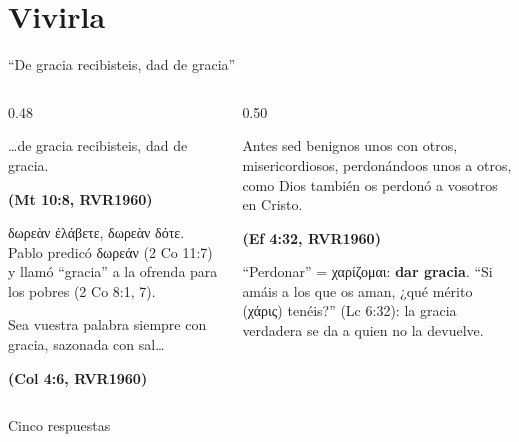 \documentclass[hyperref={bookmarks=false},aspectratio=169]{beamer}
\newcommand{\grc}[1]{\foreignlanguage{ancientgreek}{#1}}
\newcommand{\fuente}[1]{\par\hfill{\upshape\bfseries\footnotesize\textcolor{azul}{#1}}}
\newcommand{\destacar}[1]{\textbf{\textcolor{azul}{#1}}}
\begin{document}
\section{Vivirla}

\begin{frame}{``De gracia recibisteis, dad de gracia''}
\begin{columns}[t,onlytextwidth]
\begin{column}{0.48\textwidth}
\begin{cita}\ldots{}de gracia recibisteis, dad de gracia.\fuente{(Mt 10:8, RVR1960)}\end{cita}
\scriptsize \grc{δωρεὰν ἐλάβετε, δωρεὰν δότε}. Pablo predicó \grc{δωρεάν} (2 Co 11:7) y llamó ``gracia'' a la ofrenda para los pobres (2 Co 8:1, 7).
\begin{cita}Sea vuestra palabra siempre con gracia, sazonada con sal\ldots\fuente{(Col 4:6, RVR1960)}\end{cita}
\end{column}
\begin{column}{0.50\textwidth}
\begin{cita}Antes sed benignos unos con otros, misericordiosos, perdonándoos unos a otros, como Dios también os perdonó a vosotros en Cristo.\fuente{(Ef 4:32, RVR1960)}\end{cita}
\scriptsize ``Perdonar'' = \grc{χαρίζομαι}: \destacar{dar gracia}. ``Si amáis a los que os aman, ¿qué mérito (\grc{χάρις}) tenéis?'' (Lc 6:32): la gracia verdadera se da a quien no la devuelve.
\end{column}
\end{columns}
\end{frame}

\begin{frame}{Cinco respuestas}
\centering
{}
\end{frame}
\end{document}
